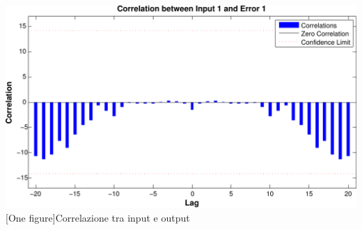 \includegraphics[scale=0.5]{images/timeseries/inlight/correlations.pdf}
[One figure]{Correlazione tra input e output}
\vspace{20px}

\clearpage
